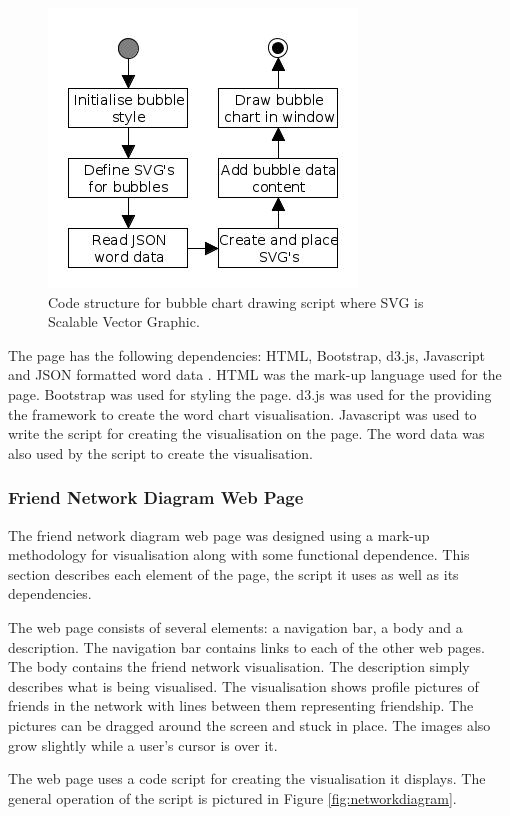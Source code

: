 \documentclass[12pt,onecolumn]{article}
\begin{document}
		\begin{figure}[h]
			\centering
			\includegraphics[scale=1]{bubbles}
			\caption{Code structure for bubble chart drawing script where SVG is Scalable Vector Graphic.} \label{fig:wordchart}
		\end{figure}

	The page has the following dependencies: HTML, Bootstrap, d3.js, Javascript and JSON formatted word data \cite{HTML, Bootstrap, D3, js, JSON}. HTML was the mark-up language used for the page. Bootstrap was used for styling the page. d3.js was used for the providing the framework to create the word chart visualisation. Javascript was used to write the script for creating the visualisation on the page. The word data was also used by the script to create the visualisation.
	
	\subsubsection{Friend Network Diagram Web Page}
	The friend network diagram web page was designed using a mark-up methodology for visualisation along with some functional dependence. This section describes each element of the page, the script it uses as well as its dependencies.

	The web page consists of several elements: a navigation bar, a body and a description. The navigation bar contains links to each of the other web pages. The body contains the friend network visualisation. The description simply describes what is being visualised. The visualisation shows profile pictures of friends in the network with lines between them representing friendship. The pictures can be dragged around the screen and stuck in place. The images also grow slightly while a user's cursor is over it.
	
	The web page uses a code script for creating the visualisation it displays.  The general operation of the script is pictured in Figure \ref{fig:networkdiagram}.
	
\end{document}
